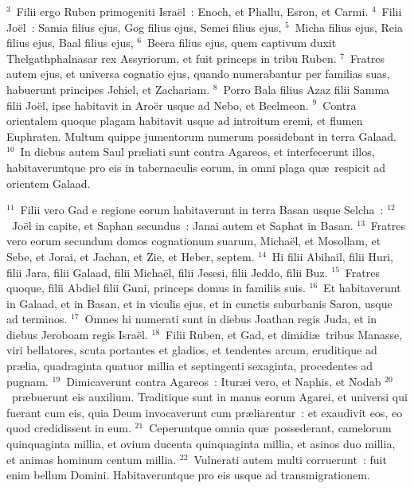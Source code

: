 ${}^{3}$~Filii ergo Ruben primogeniti Isra\"el~: Enoch, et Phallu, Esron, et Carmi.
${}^{4}$~Filii Jo\"el~: Samia filius ejus, Gog filius ejus, Semei filius ejus,
${}^{5}$~Micha filius ejus, Reia filius ejus, Baal filius ejus,
${}^{6}$~Beera filius ejus, quem captivum duxit Thelgathphalnasar rex Assyriorum, et fuit princeps in tribu Ruben.
${}^{7}$~Fratres autem ejus, et universa cognatio ejus, quando numerabantur per familias suas, habuerunt principes Jehiel, et Zachariam.
${}^{8}$~Porro Bala filius Azaz filii Samma filii Jo\"el, ipse habitavit in Aro\"er usque ad Nebo, et Beelmeon.
${}^{9}$~Contra orientalem quoque plagam habitavit usque ad introitum eremi, et flumen Euphraten. Multum quippe jumentorum numerum possidebant in terra Galaad.
${}^{10}$~In diebus autem Saul pr\ae liati sunt contra Agareos, et interfecerunt illos, habitaveruntque pro eis in tabernaculis eorum, in omni plaga qu\ae\ respicit ad orientem Galaad.


${}^{11}$~Filii vero Gad e regione eorum habitaverunt in terra Basan usque Selcha~:
${}^{12}$~Jo\"el in capite, et Saphan secundus~: Janai autem et Saphat in Basan.
${}^{13}$~Fratres vero eorum secundum domos cognationum suarum, Micha\"el, et Mosollam, et Sebe, et Jorai, et Jachan, et Zie, et Heber, septem.
${}^{14}$~Hi filii Abihail, filii Huri, filii Jara, filii Galaad, filii Micha\"el, filii Jesesi, filii Jeddo, filii Buz.
${}^{15}$~Fratres quoque, filii Abdiel filii Guni, princeps domus in familiis suis.
${}^{16}$~Et habitaverunt in Galaad, et in Basan, et in viculis ejus, et in cunctis suburbanis Saron, usque ad terminos.
${}^{17}$~Omnes hi numerati sunt in diebus Joathan regis Juda, et in diebus Jeroboam regis Isra\"el.
${}^{18}$~Filii Ruben, et Gad, et dimidi\ae\ tribus Manasse, viri bellatores, scuta portantes et gladios, et tendentes arcum, eruditique ad pr\ae lia, quadraginta quatuor millia et septingenti sexaginta, procedentes ad pugnam.
${}^{19}$~Dimicaverunt contra Agareos~: Itur\ae i vero, et Naphis, et Nodab
${}^{20}$~pr\ae buerunt eis auxilium. Traditique sunt in manus eorum Agarei, et universi qui fuerant cum eis, quia Deum invocaverunt cum pr\ae liarentur~: et exaudivit eos, eo quod credidissent in eum.
${}^{21}$~Ceperuntque omnia qu\ae\ possederant, camelorum quinquaginta millia, et ovium ducenta quinquaginta millia, et asinos duo millia, et animas hominum centum millia.
${}^{22}$~Vulnerati autem multi corruerunt~: fuit enim bellum Domini. Habitaveruntque pro eis usque ad transmigrationem.


